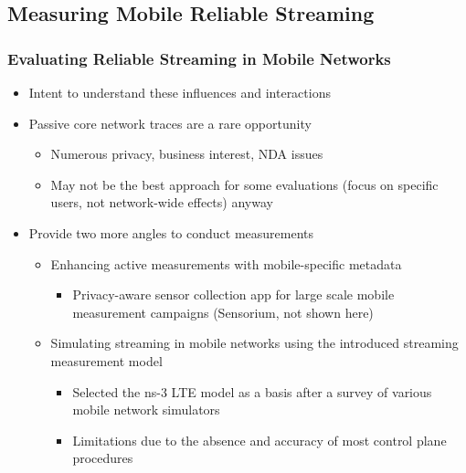 \documentclass{beamer}
\begin{document}






\subsection{Measuring Mobile Reliable Streaming}

\begin{frame}
	\frametitle{Evaluating Reliable Streaming in Mobile Networks}

	\begin{itemize}
		\item Intent to understand these influences and interactions
		\item Passive core network traces are a rare opportunity
		\begin{itemize}
			\item Numerous privacy, business interest, NDA issues
			\item May not be the best approach for some evaluations (focus on specific users, not network-wide effects) anyway
		\end{itemize}
		\item Provide two more angles to conduct measurements
		\begin{itemize}
			\item Enhancing active measurements with mobile-specific metadata
			\begin{itemize}
				\item Privacy-aware sensor collection app for large scale mobile measurement campaigns (Sensorium, not shown here)
			\end{itemize}
			\item Simulating streaming in mobile networks using the introduced streaming measurement model
			\begin{itemize}
				\item Selected the ns-3 LTE model as a basis after a survey of various mobile network simulators
				\item Limitations due to the absence and accuracy of most control plane procedures
			\end{itemize}
		\end{itemize}
	\end{itemize}
\end{frame}
\end{document}

